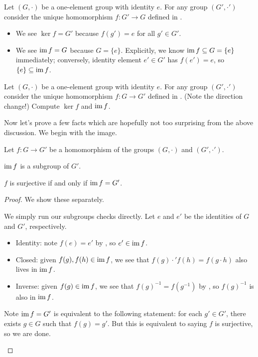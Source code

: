 \documentclass[../main.tex]{subfiles}
\begin{document}
\begin{example}
    Let $(G,\cdot)$ be a one-element group with identity $e$. For any group $(G',\cdot')$ consider the unique homomorphism $f\colon G'\to G$ defined in .
    \begin{itemize}
        \item We see $\ker f=G'$ because $f(g')=e$ for all $g'\in G'$.
        \item We see $\operatorname{im} f=G$ because $G=\{e\}$. Explicitly, we know $\operatorname{im} f\subseteq G=\{e\}$ immediately; conversely, identity element $e'\in G'$ has $f(e')=e$, so $\{e\}\subseteq\operatorname{im} f$.
    \end{itemize}
\end{example}
\begin{exe}
    Let $(G,\cdot)$ be a one-element group with identity $e$. For any group $(G',\cdot')$ consider the unique homomorphism $f\colon G\to G'$ defined in . (Note the direction change!) Compute $\ker f$ and $\operatorname{im} f$.
\end{exe}
Now let's prove a few facts which are hopefully not too surprising from the above discussion. We begin with the image.
\begin{lemma} \label{lem:im-subgroup}
    Let $f\colon G\to G'$ be a homomorphism of the groups $(G,\cdot)$ and $(G',\cdot')$.
    \begin{listalph}
        \item $\operatorname{im} f$ is a subgroup of $G'$.
        \item $f$ is surjective if and only if $\operatorname{im} f=G'$.
    \end{listalph}
\end{lemma}
\begin{proof}
    We show these separately.
    \begin{listalph}
        \item We simply run our subgroups checks directly. Let $e$ and $e'$ be the identities of $G$ and $G'$, respectively.
        \begin{itemize}
            \item Identity: note $f(e)=e'$ by , so $e'\in\operatorname{im} f$.
            \item Closed: given $f(g),f(h)\in\operatorname{im} f$, we see that $f(g)\cdot'f(h)=f(g\cdot h)$ also lives in $\operatorname{im} f$.
            \item Inverse: given $f(g)\in\operatorname{im} f$, we see that $f(g)^{-1}=f\left(g^{-1}\right)$ by , so $f(g)^{-1}$ is also in $\operatorname{im} f$.
        \end{itemize}
        \item Note $\operatorname{im} f=G'$ is equivalent to the following statement: for each $g'\in G'$, there exists $g\in G$ such that $f(g)=g'$. But this is equivalent to saying $f$ is surjective, so we are done.
        \qedhere
    \end{listalph}
\end{proof}
\end{document}

